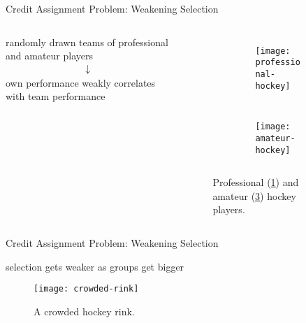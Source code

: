 \begin{frame}{Credit Assignment Problem: Weakening Selection}

\begin{columns}
\begin{column}{0.5\textwidth}
{\Large
randomly drawn teams of professional and amateur players
\begin{align*}
\bm{\downarrow}
\end{align*}
own performance weakly correlates with team performance

}
\end{column}
\begin{column}{0.5\textwidth}


\begin{figure}
\begin{subfigure}[b]{\textwidth}
\begin{columns}
\begin{column}{0.05\textwidth}
\caption{}
\label{fig:professional-hockey}
\end{column}
\begin{column}{0.95\textwidth}
\texttt{[image: professional-hockey]}
\end{column}
\end{columns}
\end{subfigure}%

\begin{subfigure}[b]{\textwidth}
\begin{columns}
\begin{column}{0.05\textwidth}
\caption{}
\label{fig:amateur-hockey}
\end{column}
\begin{column}{0.95\textwidth}
\texttt{[image: amateur-hockey]}
\end{column}
\end{columns}
\end{subfigure}

\caption{
Professional (\ref{fig:professional-hockey}) and amateur (\ref{fig:amateur-hockey}) hockey players.
}

\end{figure}
\end{column}
\end{columns}

\end{frame}

\begin{frame}{Credit Assignment Problem: Weakening Selection}

\vspace{2ex}

{\Large
selection gets weaker as groups get bigger
}

\begin{figure}
\texttt{[image: crowded-rink]}
\caption{A crowded hockey rink.}
\label{fig:crowded-rink}
\end{figure}


\end{frame}

